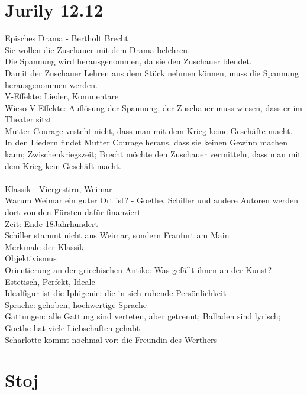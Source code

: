 \documentclass[a4paper]{article}
\begin{document}
\section{Jurily 12.12}

Episches Drama - Bertholt Brecht\\
Sie wollen die Zuschauer mit dem Drama belehren.\\
Die Spannung wird herausgenommen, da sie den Zuschauer blendet.\\
Damit der Zuschauer Lehren aus dem Stück nehmen können, muss die Spannung herausgenommen werden.\\
V-Effekte: Lieder, Kommentare\\
Wieso V-Effekte: Auflösung der Spannung, der Zuschauer muss wiesen, dass er im Theater sitzt.\\
Mutter Courage vesteht nicht, dass man mit dem Krieg keine Geschäfte macht. In den Liedern findet Mutter Courage heraus, dass sie keinen Gewinn machen kann; Zwischenkriegszeit; Brecht möchte den Zuschauer vermitteln, dass man mit dem Krieg kein Geschäft macht.\\\\

Klassik - Viergestirn, Weimar\\
Warum Weimar ein guter Ort ist? - Goethe, Schiller und andere Autoren werden dort von den Fürsten dafür finanziert\\
Zeit: Ende 18Jahrhundert\\
Schiller stammt nicht aus Weimar, sondern Franfurt am Main\\

Merkmale der Klassik:\\
Objektivismus\\
Orientierung an der griechischen Antike: Was gefällt ihnen an der Kunst? - Estetisch, Perfekt, Ideale\\
Idealfigur ist die Iphigenie: die in sich ruhende Persönlichkeit\\
Sprache: gehoben, hochwertige Sprache\\
Gattungen: alle Gattung sind verteten, aber getrennt; Balladen sind lyrisch; Goethe hat viele Liebschaften gehabt\\
Scharlotte kommt nochmal vor: die Freundin des Werthers\\

\section{Stoj}
\end{document}
